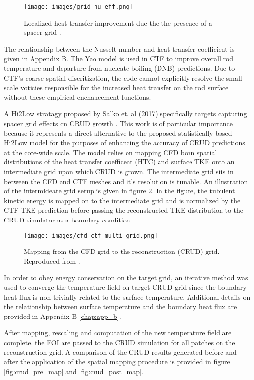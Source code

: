 \begin{figure}[!htbp]
\centering
\texttt{[image: images/grid\_nu\_eff.png]}
\caption{Localized heat transfer improvement due the the presence of a spacer grid \cite{salko17}.}
\label{fig:yao_nu}
\end{figure}

The relationship between the Nusselt number and heat transfer coefficient is given in Appendix B.
The Yao model is used in CTF to improve overall rod temperature and departure from nucleate boiling (DNB) predictions.  Due to CTF's coarse spatial discritization, the code cannot explicitly resolve the small scale voticies responsible for the increased heat transfer on the rod surface without these empirical enchancement functions.   

A Hi2Low stratagy proposed by Salko et. al (2017) specifically targets capturing spacer grid effects on CRUD growth \cite{salko17}.  This work is of particular importance because it represents a direct alternative to the proposed statistically based Hi2Low model for the purposes of enhancing the accuracy of CRUD predictions at the core-wide scale.  The model relies on mapping CFD born spatial distributions of the heat transfer coefficent (HTC) and surface TKE onto an intermediate grid upon which CRUD is grown.  The intermediate grid sits in between the CFD and CTF meshes and it's resolution is tunable.  An illustration of the intermideate grid setup is given in figure \ref{fig:cfd2ctf_map}.  In the figure, the tubulent kinetic energy is mapped on to the intermediate grid and is normalized by the CTF TKE prediction before passing the reconstructed TKE distribution to the CRUD simulator as a boundary condition. 

\begin{figure}[!htbp]
\centering
\texttt{[image: images/cfd\_ctf\_multi\_grid.png]}
\caption{Mapping from the CFD grid to the reconstruction (CRUD) grid.  Reproduced from \cite{salko17}.}
\label{fig:cfd2ctf_map}
\end{figure}

In order to obey energy conservation on the target grid,  an iterative method was used to converge the temperature field on target CRUD grid since the boundary heat flux is non-trivially related to the surface temperature.  Additional details on the relationship between surface temperature and the boundary heat flux are provided in Appendix B \ref{chap:app_b}.

After mapping, rescaling and computation of the new temperature field are complete, the FOI are passed to the CRUD simulation for all patches on the reconstruction grid.  A comparison of the CRUD results generated before and after the application of the spatial mapping procedure is provided in figure \ref{fig:crud_pre_map} and \ref{fig:crud_post_map}.

